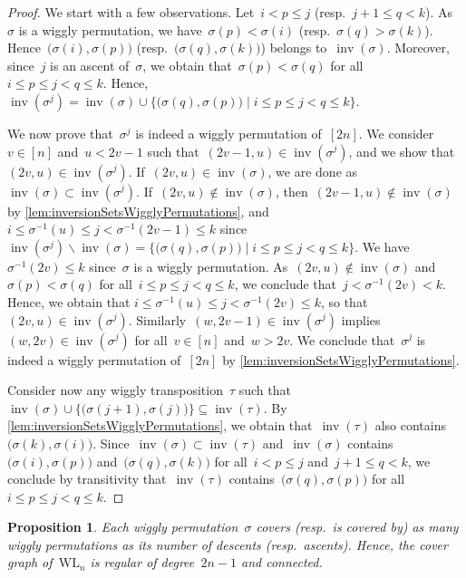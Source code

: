 \documentclass{amsart}
\newtheorem{proposition}[theorem]{Proposition}
\theoremstyle{definition}
\newcommand{\bigset}[2]{\big\{ #1 \;\big|\; #2 \big\}} %
\newcommand{\ssm}{\smallsetminus} %
\DeclareMathOperator{\inv}{inv} %
\newcommand{\wigglyLattice}{\mathrm{WL}} %
\begin{document}
\begin{proof}
We start with a few observations.
Let~$i < p \le j$ (resp.~$j+1 \le q < k$).
As~$\sigma$ is a wiggly permutation, we have~$\sigma(p) < \sigma(i)$ (resp.~$\sigma(q) > \sigma(k)$).
Hence~$\big( \sigma(i), \sigma(p) \big)$ (resp.~$\big( \sigma(q), \sigma(k) \big)$) belongs to~$\inv(\sigma)$.
Moreover, since~$j$ is an ascent of~$\sigma$, we obtain that~$\sigma(p) < \sigma(q)$ for all~${i \le p \le j < q \le k}$.
Hence, $\inv(\sigma^j) = \inv(\sigma) \cup \bigset{ \big( \sigma(q), \sigma(p) \big) }{i \le p \le j < q \le k}$.

We now prove that~$\sigma^j$ is indeed a wiggly permutation of~$[2n]$.
We consider~$v \in [n]$ and~$u < 2v-1$ such that~$(2v-1, u) \in \inv(\sigma^j)$, and we show that~$(2v, u) \in \inv(\sigma^j)$.
If~$(2v, u) \in \inv(\sigma)$, we are done as~$\inv(\sigma) \subset \inv(\sigma^j)$.
If~$(2v, u) \not\in \inv(\sigma)$, then~$(2v-1, u) \not\in \inv(\sigma)$ by \cref{lem:inversionSetsWigglyPermutations}, and~$i \le \sigma^{-1}(u) \le j < \sigma^{-1}(2v-1) \le k$ since~${\inv(\sigma^j) \ssm \inv(\sigma) = \bigset{ \big( \sigma(q), \sigma(p) \big) }{i \le p \le j < q \le k}}$.
We have~$\sigma^{-1}(2v) \le k$ since~$\sigma$ is a wiggly permutation.
As~$(2v, u) \not\in \inv(\sigma)$ and~$\sigma(p) < \sigma(q)$ for all~$i \le p \le j < q \le k$, we conclude that~$j < \sigma^{-1}(2v) < k$.
Hence, we obtain that ${i \le \sigma^{-1}(u) \le j < \sigma^{-1}(2v) \le k}$, so that~$(2v,u) \in \inv(\sigma^j)$.
Similarly~${(w, 2v-1) \in \inv(\sigma^j)}$ implies~$(w, 2v) \in \inv(\sigma^j)$ for all~$v \in [n]$ and~$w > 2v$.
We conclude that~$\sigma^j$ is indeed a wiggly permutation of~$[2n]$ by \cref{lem:inversionSetsWigglyPermutations}.

Consider now any wiggly transposition~$\tau$ such that~$\inv(\sigma) \cup \big\{ \big( \sigma(j+1), \sigma(j) \big) \big\} \subseteq \inv(\tau)$.
By \cref{lem:inversionSetsWigglyPermutations}, we obtain that~$\inv(\tau)$ also contains %
$\big( \sigma(k), \sigma(i) \big)$.
Since~$\inv(\sigma) \subset \inv(\tau)$ and~$\inv(\sigma)$ contains~$\big( \sigma(i), \sigma(p) \big)$ and~$\big( \sigma(q), \sigma(k) \big)$ for all~$i < p \le j$ and~$j+1 \le q < k$, we conclude by transitivity that~$\inv(\tau)$ contains~$\big( \sigma(q), \sigma(p) \big)$ for all~$i \le p \le j < q \le k$.
\end{proof}

\begin{proposition}
Each wiggly permutation~$\sigma$ covers (resp.~is covered by) as many wiggly permutations as its number of descents (resp.~ascents).
Hence, the cover graph of~$\wigglyLattice_n$ is regular of degree~$2n-1$ and connected.
\end{proposition}
\end{document}
